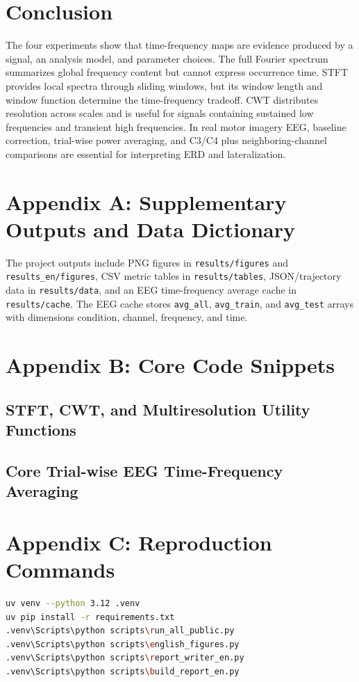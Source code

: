 \documentclass[a4paper,11pt]{article}
\numberwithin{equation}{section}
\begin{document}
\section{Conclusion}
The four experiments show that time-frequency maps are evidence produced by a signal, an analysis model, and parameter choices. The full Fourier spectrum summarizes global frequency content but cannot express occurrence time. STFT provides local spectra through sliding windows, but its window length and window function determine the time-frequency tradeoff. CWT distributes resolution across scales and is useful for signals containing sustained low frequencies and transient high frequencies. In real motor imagery EEG, baseline correction, trial-wise power averaging, and C3/C4 plus neighboring-channel comparisons are essential for interpreting ERD and lateralization.

\appendix
\clearpage
\section{Appendix A: Supplementary Outputs and Data Dictionary}
The project outputs include PNG figures in \texttt{results/figures} and \texttt{results\_en/figures}, CSV metric tables in \texttt{results/tables}, JSON/trajectory data in \texttt{results/data}, and an EEG time-frequency average cache in \texttt{results/cache}. The EEG cache stores \texttt{avg\_all}, \texttt{avg\_train}, and \texttt{avg\_test} arrays with dimensions condition, channel, frequency, and time.

\section{Appendix B: Core Code Snippets}
\subsection{STFT, CWT, and Multiresolution Utility Functions}


\subsection{Core Trial-wise EEG Time-Frequency Averaging}


\section{Appendix C: Reproduction Commands}
\begin{lstlisting}[language=bash]
uv venv --python 3.12 .venv
uv pip install -r requirements.txt
.venv\Scripts\python scripts\run_all_public.py
.venv\Scripts\python scripts\english_figures.py
.venv\Scripts\python scripts\report_writer_en.py
.venv\Scripts\python scripts\build_report_en.py
\end{lstlisting}
\end{document}
